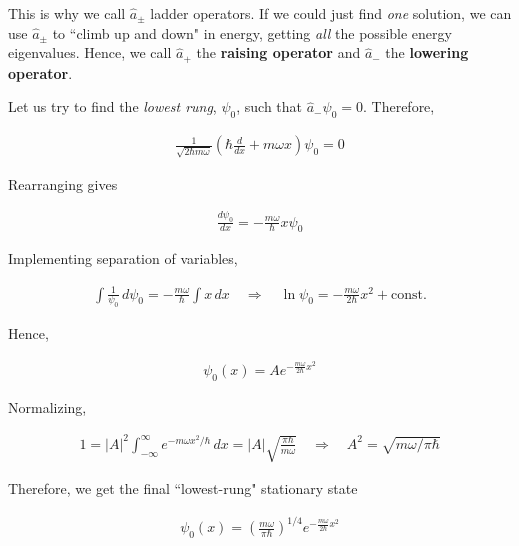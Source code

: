 This is why we call $\hat{a}_\pm$ ladder operators. If we could just find
\textit{one} solution, we can use $\hat{a}_\pm$ to ``climb up and down" in
energy, getting \textit{all} the possible energy eigenvalues. Hence, we call
$\hat{a}_+$ the \textbf{raising operator} and $\hat{a}_-$ the \textbf{lowering
operator}. 

Let us try to find the \textit{lowest rung}, $\psi_0$, such that
$\hat{a}_-\psi_0 = 0$. Therefore, 

\begin{align} \label{}
  \frac{1}{\sqrt{2\hbar m \omega}} \left( \hbar \frac{d }{d x} + m\omega
  x \right) \psi_0 = 0 
\end{align}\vspace{3px}

Rearranging gives 

\begin{align} \label{}
  \frac{d \psi_0}{d x} = -\frac{m\omega}{\hbar}x\psi_0
\end{align}\vspace{3px}

Implementing separation of variables, 

\begin{align} \label{}
  \int \frac{1}{\psi_0} \, d\psi_0 = -\frac{m\omega}{\hbar} \int x \, dx \quad
  \Rightarrow \quad \ln \psi_0 = -\frac{m\omega}{2\hbar} x^2 + \text{const.} 
\end{align}\vspace{3px}

Hence, 

\begin{align} \label{}
  \psi_0(x) = A e^{-\frac{m\omega}{2\hbar}x^2}
\end{align}\vspace{3px}

Normalizing, 

\begin{align} \label{}
  1 = |A|^2 \int_{-\infty}^{\infty} e^{-m\omega x^2 / \hbar} \, dx
    = |A|\sqrt{\frac{\pi \hbar}{m\omega}} \quad \Rightarrow \quad A^2
    = \sqrt{m\omega / \pi \hbar}
\end{align}\vspace{3px}

Therefore, we get the final ``lowest-rung" stationary state 

\begin{align} \label{lowestrung}
  \psi_0(x) = \left( \frac{m\omega}{\pi \hbar} \right) ^{1/4}
  e^{-\frac{m\omega}{2\hbar}x^2} 
\end{align}\vspace{3px}

